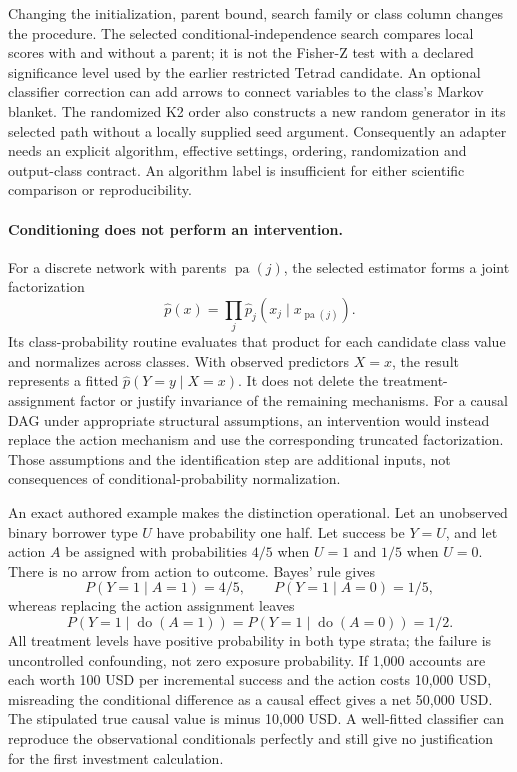 Changing the initialization, parent bound, search family or class column
changes the procedure. The selected conditional-independence search compares
local scores with and without a parent; it is not the Fisher-Z test with a
declared significance level used by the earlier restricted Tetrad candidate.
An optional classifier correction can add arrows to connect variables to the
class's Markov blanket. The randomized K2 order also constructs a new random
generator in its selected path without a locally supplied seed argument.
Consequently an adapter needs an explicit algorithm, effective settings,
ordering, randomization and output-class contract. An algorithm label is
insufficient for either scientific comparison or reproducibility.
\citep{exec24_weka_source}

\paragraph{Conditioning does not perform an intervention.}
For a discrete network with parents $\operatorname{pa}(j)$, the selected
estimator forms a joint factorization
\[
 \widehat p(x)=\prod_j\widehat p_j(x_j\mid x_{\operatorname{pa}(j)}).
\]
Its class-probability routine evaluates that product for each candidate class
value and normalizes across classes. With observed predictors $X=x$, the
result represents a fitted $\widehat p(Y=y\mid X=x)$. It does not delete the
treatment-assignment factor or justify invariance of the remaining mechanisms.
For a causal DAG under appropriate structural assumptions, an intervention
would instead replace the action mechanism and use the corresponding truncated
factorization. Those assumptions and the identification step are additional
inputs, not consequences of conditional-probability normalization.
\citep{exec24_weka_source,exec24_weka_choice}

An exact authored example makes the distinction operational. Let an unobserved
binary borrower type $U$ have probability one half. Let success be $Y=U$,
and let action $A$ be assigned with probabilities $4/5$ when $U=1$ and $1/5$
when $U=0$. There is no arrow from action to outcome. Bayes' rule gives
\[
 P(Y=1\mid A=1)=4/5,\qquad P(Y=1\mid A=0)=1/5,
\]
whereas replacing the action assignment leaves
\[
 P(Y=1\mid\operatorname{do}(A=1))=
 P(Y=1\mid\operatorname{do}(A=0))=1/2.
\]
All treatment levels have positive probability in both type strata; the failure
is uncontrolled confounding, not zero exposure probability. If 1,000 accounts
are each worth 100 USD per incremental success and the action costs 10,000 USD,
misreading the conditional difference as a causal effect gives a net 50,000 USD.
The stipulated true causal value is minus 10,000 USD. A well-fitted classifier
can reproduce the observational conditionals perfectly and still give no
justification for the first investment calculation.\citep{exec24_weka_choice}

